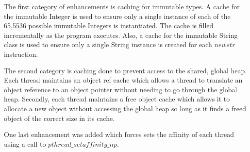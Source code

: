 The first category of enhancements is caching for immutable types.  A
cache for the immutable Integer is used to ensure only a single
instance of each of the 65,5536 possible immutable Integers is
instantiated.  The cache is filled incrementally as the program
executes.  Also, a cache for the immutable String class is used to
ensure only a single String instance is created for each $newstr$
instruction.

The second category is caching done to prevent access to the shared,
global heap.  Each thread maintains an object ref cache which allows a
thread to translate an object reference to an object pointer without
needing to go through the global heap.  Secondly, each thread
maintains a free object cache which allows it to allocate a new object
without accessing the global heap so long as it finds a freed object
of the correct size in its cache.

One last enhancement was added which forces sets the affinity of each
 thread using a call to $pthread\_setaffinity\_np$.

